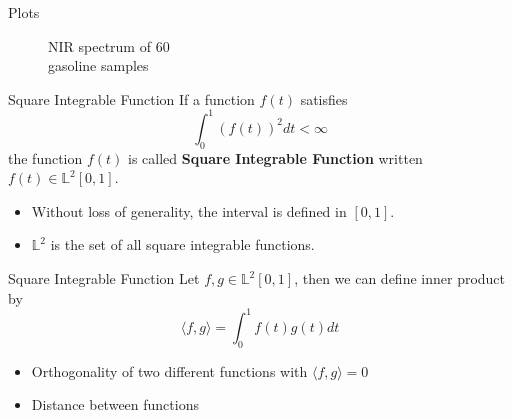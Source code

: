 \documentclass{beamer}
\begin{document}
\begin{frame}{Plots}
\begin{minipage}{.5\textwidth}
\begin{figure}
				\caption{NIR spectrum of 60 \\ gasoline samples}
			\end{figure}
		\end{minipage}
	\end{frame}
	
	\begin{frame}{Square Integrable Function}
		If a function $f(t)$ satisfies
		$$\int_{0}^{1} \left(f(t)\right)^{2}dt < \infty$$
		the function $f(t)$ is called \textbf{Square Integrable Function} written $f(t) \in \mathbb{L}^{2}[0,1]$.
		\begin{itemize}
			\item Without loss of generality, the interval is defined in $[0,1]$.
			\item $\mathbb{L}^{2}$ is the set of all square integrable functions.
		\end{itemize}
	\end{frame}
	
	\begin{frame}{Square Integrable Function}
		Let $f, g \in \mathbb{L}^{2}[0,1]$, then we can define inner product by
		$$\langle f,g \rangle = \int_{0}^{1} f(t)g(t)dt$$
		\begin{itemize}
			\item Orthogonality of two different functions with $\langle f,g \rangle = 0$
			\item Distance between functions
		\end{itemize}
	\end{frame}
	
	
\end{document}
